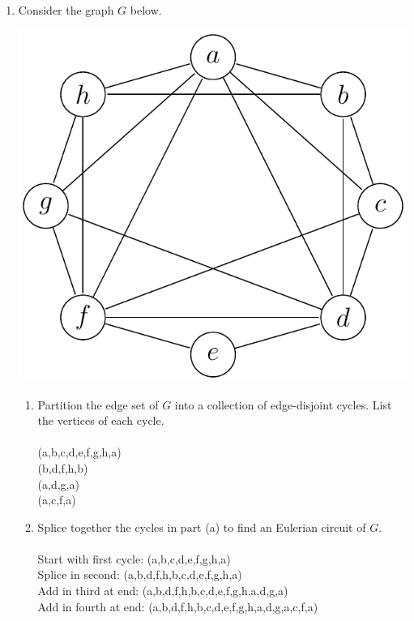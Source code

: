 \documentclass[12pt]{article}
\begin{document}
\begin{enumerate}
\item Consider the graph $G$ below.
\begin{center}
\includegraphics[scale=.5]{4_2.pdf}
\end{center}

\begin{enumerate}
\item Partition the edge set of $G$ into a collection of edge-disjoint cycles. List the vertices of each cycle.\\\\
(a,b,c,d,e,f,g,h,a)\\
(b,d,f,h,b)\\
(a,d,g,a)\\
(a,c,f,a)\\

\item Splice together the cycles in part (a) to find an Eulerian circuit of $G$.\\\\
Start with first cycle: (a,b,c,d,e,f,g,h,a)\\
Splice in second: (a,b,d,f,h,b,c,d,e,f,g,h,a)\\
Add in third at end: (a,b,d,f,h,b,c,d,e,f,g,h,a,d,g,a)\\
Add in fourth at end: (a,b,d,f,h,b,c,d,e,f,g,h,a,d,g,a,c,f,a)\\
\end{enumerate}




\end{enumerate}
\end{document}

